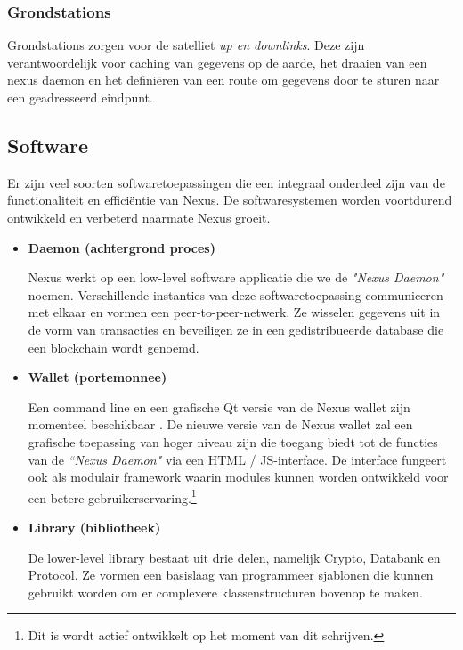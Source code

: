 \documentclass[11pt]{article}
\begin{document}
\subsubsection{Grondstations}

Grondstations zorgen voor de satelliet \textit{up en downlinks}. 
Deze zijn verantwoordelijk voor caching van gegevens op de aarde, het draaien van een nexus daemon en het defini\"eren van een route om gegevens door te sturen naar een geadresseerd eindpunt.

\subsection{Software}

Er zijn veel soorten softwaretoepassingen die een integraal onderdeel zijn van de functionaliteit en effici\"entie van Nexus. De softwaresystemen worden voortdurend ontwikkeld en verbeterd naarmate Nexus groeit.

\begin{itemize}
\item \textbf{Daemon (achtergrond proces)}

Nexus werkt op een low-level software applicatie die we de \textit{"Nexus Daemon"} noemen.
Verschillende instanties van deze softwaretoepassing communiceren met elkaar en vormen een peer-to-peer-netwerk. Ze wisselen gegevens uit in de vorm van transacties en beveiligen ze in een gedistribueerde database die een blockchain wordt genoemd.

\item \textbf{Wallet (portemonnee)}

Een command line en een grafische Qt versie van de Nexus wallet zijn momenteel beschikbaar \cite{githubnexusreleases} \cite{nexusearth}.
De nieuwe versie van de Nexus wallet zal een grafische toepassing van hoger niveau zijn die toegang biedt tot de functies van de \textit{``Nexus Daemon"} via een HTML / JS-interface. 
De interface fungeert ook als modulair framework waarin modules kunnen worden ontwikkeld voor een betere gebruikerservaring.\footnote{Dit is wordt actief ontwikkelt op het moment van dit schrijven.}

\item \textbf{Library (bibliotheek)}

De lower-level library bestaat uit drie delen, namelijk Crypto, Databank en Protocol. Ze vormen een basislaag van programmeer sjablonen die kunnen  gebruikt worden om er complexere klassenstructuren bovenop te maken. 

\end{itemize}
\end{document}

